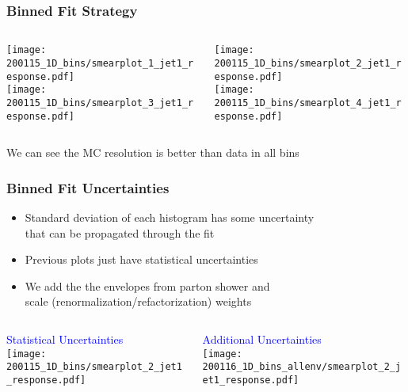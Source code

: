 \documentclass{beamer}
\begin{document}
\begin{frame}
  \frametitle{Binned Fit Strategy}

  \begin{columns}
    \begin{column}{0.3\linewidth}
      \centering
      \texttt{[image: 200115\_1D\_bins/smearplot\_1\_jet1\_response.pdf]} \\
      \texttt{[image: 200115\_1D\_bins/smearplot\_3\_jet1\_response.pdf]}
    \end{column}
    \begin{column}{0.3\linewidth}
      \centering
      \texttt{[image: 200115\_1D\_bins/smearplot\_2\_jet1\_response.pdf]} \\
      \texttt{[image: 200115\_1D\_bins/smearplot\_4\_jet1\_response.pdf]}
    \end{column}
  \end{columns}

  \vfill
  We can see the MC resolution is better than data in all bins

\end{frame}


\begin{frame}
  \frametitle{Binned Fit Uncertainties}

  \begin{itemize}
  \item Standard deviation of each histogram has some uncertainty \\
    that can be propagated through the fit
  \item Previous plots just have statistical uncertainties
  \item We add the the envelopes from parton shower and \\
    scale (renormalization/refactorization) weights
  \end{itemize}

  \begin{columns}
    \begin{column}{0.5\linewidth}
      \centering
      \textcolor{blue}{Statistical Uncertainties} \\
      \texttt{[image: 200115\_1D\_bins/smearplot\_2\_jet1\_response.pdf]}
    \end{column}
    \begin{column}{0.5\linewidth}
      \centering
      \textcolor{blue}{Additional Uncertainties} \\
      \texttt{[image: 200116\_1D\_bins\_allenv/smearplot\_2\_jet1\_response.pdf]}
    \end{column}
  \end{columns}

\end{frame}
\end{document}
